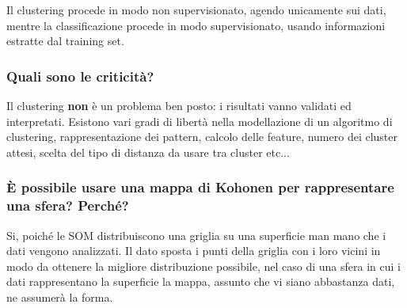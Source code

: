 \documentclass[\main/main.tex]{subfiles}
\begin{document}
Il clustering procede in modo non supervisionato, agendo unicamente sui dati, mentre la classificazione procede in modo supervisionato, usando informazioni estratte dal training set.

\subsubsection*{Quali sono le criticità?}
Il clustering \textbf{non} è un problema ben posto: i risultati vanno validati ed interpretati. Esistono vari gradi di libertà nella modellazione di un algoritmo di clustering, rappresentazione dei pattern, calcolo delle feature, numero dei cluster attesi, scelta del tipo di distanza da usare tra cluster etc...

\subsubsection*{È possibile usare una mappa di Kohonen per rappresentare una sfera? Perché?}
Si, poiché le SOM distribuiscono una griglia su una superficie man mano che i dati vengono analizzati. Il dato sposta i punti della griglia con i loro vicini in modo da ottenere la migliore distribuzione possibile, nel caso di una sfera in cui i dati rappresentano la superficie la mappa, assunto che vi siano abbastanza dati, ne assumerà la forma.
\end{document}
